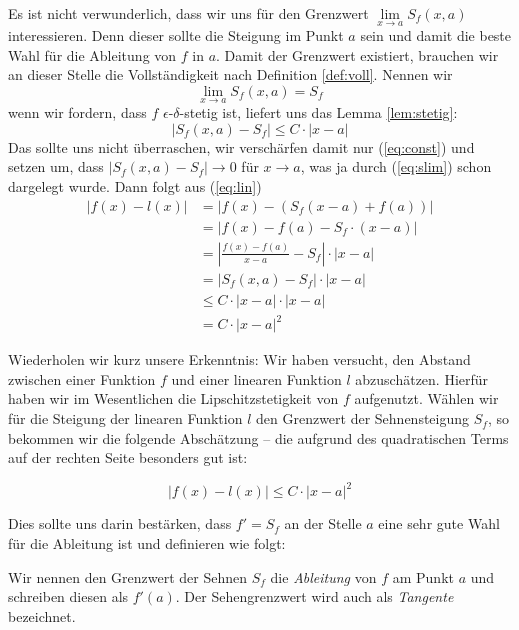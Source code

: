 Es ist nicht verwunderlich, dass wir uns für den Grenzwert $\lim\limits_{x\rightarrow a} S_f(x,a)$ interessieren. Denn dieser sollte die Steigung im Punkt $a$ sein und damit die beste Wahl für die Ableitung von $f$ in $a$. Damit der Grenzwert existiert, brauchen wir an dieser Stelle die Vollständigkeit nach Definition \ref{def:voll}. Nennen wir 
\begin{equation}\label{eq:slim}
\lim\limits_{x\rightarrow a} S_f(x,a) = S_f
\end{equation}
wenn wir fordern, dass $f$ $\epsilon$-$\delta$-stetig ist, liefert uns das Lemma \ref{lem:stetig}: 
\[
|S_f(x,a) - S_f| \le C\cdot |x-a|
\]
Das sollte uns nicht überraschen, wir verschärfen damit nur (\ref{eq:const}) und setzen um, dass $|S_f(x,a) - S_f| \rightarrow 0$ für $x\rightarrow a$, was ja durch (\ref{eq:slim}) schon dargelegt wurde.
Dann folgt aus (\ref{eq:lin})
\begin{equation}
\begin{split}
|f(x)-l(x)| &= |f(x)-(S_f(x-a)+f(a))| \\
&= |f(x)-f(a) -S_f\cdot (x-a)| \\
&= \left| \frac{f(x)-f(a)}{x-a} -S_f \right| \cdot |x-a| \\
&= \left| S_f(x,a) -S_f \right| \cdot |x-a| \\
&\le C\cdot |x-a| \cdot |x-a| \\
&= C\cdot |x-a|^2
\end{split}
\end{equation}

Wiederholen wir kurz unsere Erkenntnis: Wir haben versucht, den Abstand zwischen einer Funktion $f$ und einer linearen Funktion $l$ abzuschätzen. Hierfür haben wir im Wesentlichen die Lipschitzstetigkeit von $f$ aufgenutzt. Wählen wir für die Steigung der linearen Funktion $l$ den Grenzwert der Sehnensteigung $S_f$, so bekommen wir die folgende Abschätzung -- die aufgrund des quadratischen Terms auf der rechten Seite besonders gut ist:

\begin{equation}
\left| f(x)-l(x) \right| \le C\cdot |x-a|^2
\end{equation}

Dies sollte uns darin bestärken, dass $f'=S_f$ an der Stelle $a$ eine sehr gute Wahl für die Ableitung ist und definieren wie folgt:

\begin{definition}\label{def:diff}
Wir nennen den Grenzwert der Sehnen $S_f$ die \emph{Ableitung} von $f$ am Punkt $a$ und schreiben diesen als $f'(a)$. Der Sehengrenzwert wird auch als \emph{Tangente} bezeichnet. 
\end{definition}


